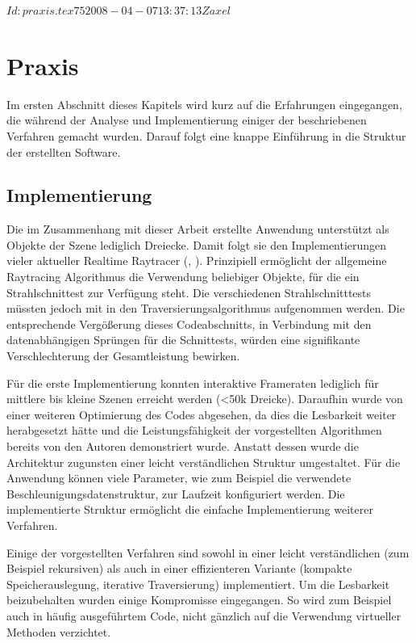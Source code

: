 \svnInfo $Id: praxis.tex 75 2008-04-07 13:37:13Z axel $
\chapter{Praxis}

Im ersten Abschnitt dieses Kapitels wird kurz auf die Erfahrungen eingegangen, die während der Analyse und Implementierung einiger der beschriebenen Verfahren gemacht wurden. Darauf folgt eine knappe Einführung in die Struktur der erstellten Software.

\label{chap:fazit}
\section{Implementierung}

Die im Zusammenhang mit dieser Arbeit erstellte Anwendung unterstützt als Objekte der Szene lediglich Dreiecke. Damit folgt sie den Implementierungen vieler aktueller Realtime Raytracer (\cite{Wald04}, \cite{Waechter08}). Prinzipiell ermöglicht der allgemeine Raytracing Algorithmus die Verwendung beliebiger Objekte, für die ein Strahlschnittest zur Verfügung steht. Die verschiedenen Strahlschnitttests müssten jedoch mit in den Traversierungsalgorithmus aufgenommen werden. Die entsprechende Vergößerung dieses Codeabschnitts, in Verbindung mit den datenabhängigen Sprüngen für die Schnittests, würden eine signifikante Verschlechterung der Gesamtleistung bewirken.

Für die erste Implementierung konnten interaktive Frameraten lediglich für mittlere bis kleine Szenen erreicht werden (<50k Dreicke). Daraufhin wurde von einer weiteren Optimierung des Codes abgesehen, da dies die Lesbarkeit weiter herabgesetzt hätte und die Leistungsfähigkeit der vorgestellten Algorithmen bereits von den Autoren demonstriert wurde.
Anstatt dessen wurde die Architektur zugunsten einer leicht verständlichen Struktur umgestaltet. Für die Anwendung können viele Parameter, wie zum Beispiel die verwendete Beschleunigungsdatenstruktur, zur Laufzeit konfiguriert werden.
Die implementierte Struktur ermöglicht die einfache Implementierung weiterer Verfahren.

Einige der vorgestellten Verfahren sind sowohl in einer leicht verständlichen (zum Beispiel rekursiven) als auch in einer effizienteren Variante (kompakte Speicherauslegung, iterative Traversierung) implementiert. Um die Lesbarkeit beizubehalten wurden einige Kompromisse eingegangen. So wird zum Beispiel auch in häufig ausgeführtem Code, nicht gänzlich auf die Verwendung virtueller Methoden verzichtet.

